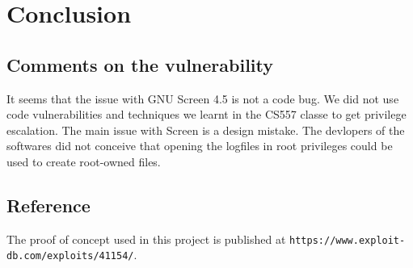 \section{Conclusion}
\subsection{Comments on the vulnerability}
It seems that the issue with GNU Screen 4.5 is not a code bug. We did not use code vulnerabilities and techniques we learnt in the CS557 classe to get privilege escalation. The main issue with Screen is a design mistake. The devlopers of the softwares did not conceive that opening the logfiles in root privileges could be used to create root-owned files.

\subsection{Reference}
The proof of concept used in this project is published at {\tt https://www.exploit-db.com/exploits/41154/}.
